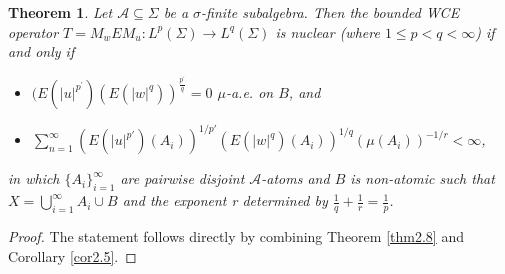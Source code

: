 \documentclass{amsart}
\newtheorem{thm}{Theorem}[section]
\theoremstyle{definition}\newtheorem{defn}[thm]{Definition}
\theoremstyle{remark}
\numberwithin{equation}{section}
\newcommand{\A}{\mathcal{A}}
\begin{document}
\begin{thm}\label{thm2.10}
	Let $\A \subseteq \Sigma$ be a $\sigma$-finite subalgebra. Then the bounded WCE operator $T = M_w E M_u : L^p(\Sigma) \to L^q(\Sigma)$ is nuclear (where  $1 \leq p<q < \infty$) if and only if
	\begin{itemize}
		\item[(i)] $(E(|u|^{p^{\prime}})(E(|w|^{q}))^{\frac{p^{\prime}}{q}} = 0$ $\mu$-a.e. on $B$, and
		\item[(ii)]
		 $\sum_{n=1}^{\infty} (E(|u|^{p'})(A_i))^{1/{p'}} (E(|w|^q)(A_i))^{1/q} (\mu(A_i))^{-1/r} < \infty$,
	\end{itemize}
	in which $\{A_i\}_{i=1}^{\infty}$ are pairwise disjoint $\A$-atoms and $B$ is non-atomic such that $X = \bigcup_{i=1}^{\infty} A_i \cup B$ and the exponent r determined by $\frac{1}{q} + \frac{1}{r} = \frac{1}{p}$.
\end{thm}
\begin{proof}
		The statement follows directly by combining Theorem \ref{thm2.8} and Corollary \ref{cor2.5}.
\end{proof}
\end{document}
